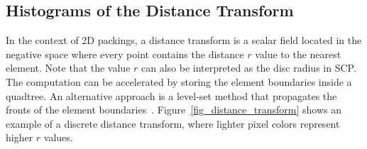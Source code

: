 \subsection{Histograms of the Distance Transform}




\newtext
{
In the context of 2D packings, a distance transform is a scalar field located in the negative space where every point
contains the distance $r$ value to the nearest  element.
Note that the value $r$ can also be interpreted as the disc radius in SCP.
The computation can be accelerated by storing the element boundaries inside a quadtree.
An alternative approach is a level-set method that propagates the fronts of the element boundaries~\cite{Osher1988}.
Figure~\ref{fig_distance_transform} shows an example of a discrete distance transform,
where lighter pixel colors represent higher $r$ values.
}

